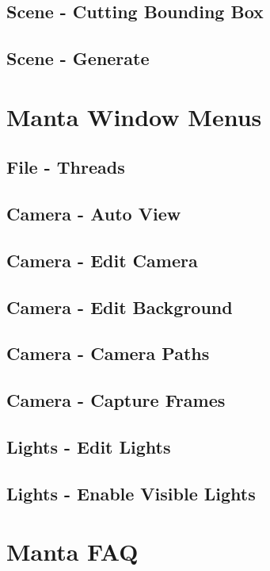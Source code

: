 \subsection{Scene - Cutting Bounding Box}

\subsection{Scene - Generate}

\section{Manta Window Menus}

\subsection{File - Threads}

\subsection{Camera - Auto View}

\subsection{Camera - Edit Camera}

\subsection{Camera - Edit Background}

\subsection{Camera - Camera Paths}

\subsection{Camera - Capture Frames}

\subsection{Lights - Edit Lights}

\subsection{Lights - Enable Visible Lights}


\section{Manta FAQ}

